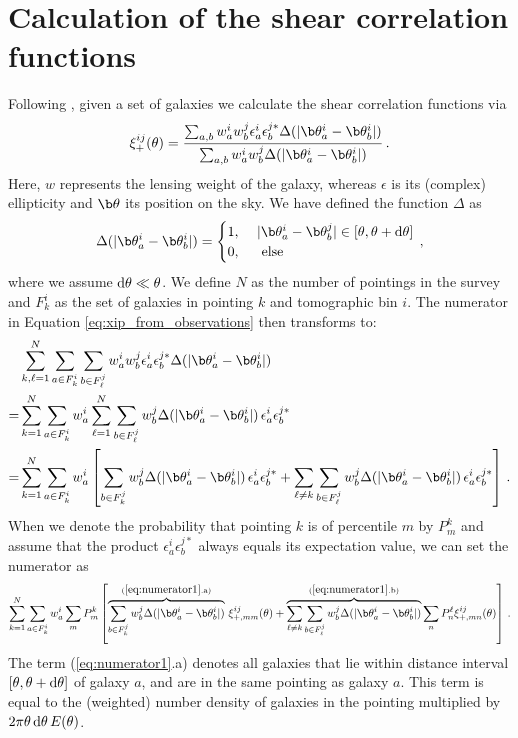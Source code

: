 \section{Calculation of the shear correlation functions}
\label{sec:calc of xipm}
Following \citet{2017MNRAS.465.1454H}, given a set of galaxies we calculate the shear correlation functions via \begin{equation}
\xi^{ij}_+(\theta) = \frac{\sum_{a,b}w_a^iw_b^j\epsilon_a^i\epsilon_b^{j*}\Delta(|\b\theta_a^i-\b\theta_b^i|)}{\sum_{a,b}w_a^iw_b^j\Delta(|\b\theta_a^i-\b\theta_b^i|)}\, .
\label{eq:xip_from_observations}
\end{equation}
Here, $w$ represents the lensing weight of the galaxy, whereas $\epsilon$ is its (complex) ellipticity and $\b \theta$ its position on the sky. We have defined the function $\Delta$ as \[
\Delta(|\b\theta_a^i-\b\theta_b^i|) = \begin{cases}
1, \,\, & |\b\theta_a^i-\b\theta_b^j| \in [\theta,\theta+{\rm d}\theta] \\
0, & \text{ else}
\end{cases}\, ,
\]
where we assume ${\rm d}\theta \ll \theta$. We define $N$ as the number of pointings in the survey and $F_k^i$ as the set of galaxies in pointing $k$ and tomographic bin $i$. The numerator in Equation \eqref{eq:xip_from_observations} then transforms to: \begin{align}
& \sum_{k,\ell=1}^N \sum_{a\in F_k^i}\sum_{b\in F_{\ell}^j} w_a^iw_b^j\epsilon_a^i\epsilon_b^{j*} \Delta(|\b\theta_a^i-\b\theta_b^i|) \nonumber\\
 = & \sum_{k=1}^N\sum_{a\in F_k^i}w_a^i \sum_{\ell=1}^N \sum_{b\in F_{\ell}^j} w_b^j \Delta(|\b\theta_a^i-\b\theta_b^i|)\, \epsilon_a^i\epsilon_b^{j*} \nonumber\\
  = & \sum_{k=1}^N\sum_{a\in F_k^i}w_a^i \left[\sum_{b\in F_{k}^j} w_b^j \Delta(|\b\theta_a^i-\b\theta_b^i|)\, \epsilon_a^i\epsilon_b^{j*} + \sum_{\ell\neq k} \sum_{b\in F_{\ell}^j} w_b^j \Delta(|\b\theta_a^i-\b\theta_b^i|)\, \epsilon_a^i\epsilon_b^{j*}\right] \, .
\end{align}
When we denote the probability that pointing $k$ is of percentile $m$ by $P_m^k$ and assume that the product $\epsilon_a^i\epsilon_b^{j*}$ always equals its expectation value, we can set the numerator as \[
\sum_{k=1}^N\sum_{a\in F_k^i}w_a^i \sum_m P_m^k \left[\overbrace{\sum_{b\in F_{k}^j} w_b^j \Delta(|\b\theta_a^i-\b\theta_b^i|)}^{\rm{(\ref{eq:numerator1}.a)}}\,  \xi_{+,mm}^{ij}(\theta) + \overbrace{\sum_{\ell\neq k} \sum_{b\in F_{\ell}^j} w_b^j \Delta(|\b\theta_a^i-\b\theta_b^i|)}^{\rm{(\ref{eq:numerator1}.b)}} \sum_n P_n^{\ell} \xi_{+,mn}^{ij}(\theta)\right] \, .
\label{eq:numerator1}
\]
The term (\ref{eq:numerator1}.a) denotes all galaxies that lie within distance interval $[\theta,\theta+{\rm d}\theta]$ of galaxy $a$, and are in the same pointing as galaxy $a$. This term is equal to the (weighted) number density of galaxies in the pointing multiplied by $2\pi\theta\, {\rm d}\theta\, E(\theta)$. 

